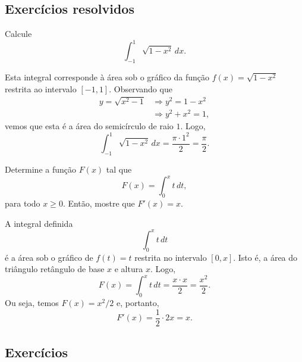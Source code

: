 \subsection*{Exercícios resolvidos}

\begin{exeresol}
  Calcule
  \begin{equation}
    \int_{-1}^1 \sqrt{1 - x^2}\,dx.
  \end{equation}
\end{exeresol}
\begin{resol}
  Esta integral corresponde à área sob o gráfico da função $f(x) = \sqrt{1 - x^2}$ restrita ao intervalo $[-1, 1]$. Observando que
  \begin{align}
    y = \sqrt{x^2 - 1} &\Rightarrow y^2 = 1 - x^2\\
                       &\Rightarrow y^2 + x^2 = 1,
  \end{align}
  vemos que esta é a área do semicírculo de raio $1$. Logo,
  \begin{equation}
    \int_{-1}^1 \sqrt{1 - x^2}\,dx = \frac{\pi \cdot 1^2}{2} = \frac{\pi}{2}.
  \end{equation}
\end{resol}

\begin{exeresol}
  Determine a função $F(x)$ tal que
  \begin{equation}
    F(x) = \int_0^x t\,dt,
  \end{equation}
  para todo $x\geq 0$. Então, mostre que $F'(x) = x$.
\end{exeresol}
\begin{resp}
  A integral definida
  \begin{equation}
    \int_0^x t\,dt
  \end{equation}
  é a área sob o gráfico de $f(t) = t$ restrita no intervalo $[0, x]$. Isto é, a área do triângulo retângulo de base $x$ e altura $x$. Logo,
  \begin{equation}
    F(x) = \int_0^x t\,dt = \frac{x\cdot x}{2} = \frac{x^2}{2}.
  \end{equation}
  Ou seja, temos $F(x) = x^2/2$ e, portanto,
  \begin{equation}
    F'(x) = \frac{1}{2}\cdot 2x = x.
  \end{equation}
\end{resp}

\subsection*{Exercícios}

